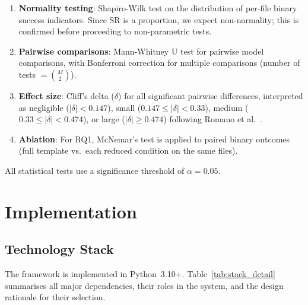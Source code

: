 \begin{enumerate}
  \item \textbf{Normality testing}: Shapiro-Wilk test on the distribution of
    per-file binary success indicators.  Since SR is a proportion, we expect
    non-normality; this is confirmed before proceeding to non-parametric tests.
  \item \textbf{Pairwise comparisons}: Mann-Whitney U test for pairwise model
    comparisons, with Bonferroni correction for multiple comparisons (number
    of tests $= \binom{M}{2}$).
  \item \textbf{Effect size}: Cliff's delta ($\delta$) for all significant
    pairwise differences, interpreted as negligible ($|\delta| < 0.147$),
    small ($0.147 \leq |\delta| < 0.33$), medium ($0.33 \leq |\delta| < 0.474$),
    or large ($|\delta| \geq 0.474$) following Romano et al.\ \cite{romano2006}.
  \item \textbf{Ablation}: For RQ1, McNemar's test is applied to paired binary
    outcomes (full template vs.\ each reduced condition on the same files).
\end{enumerate}

\noindent
All statistical tests use a significance threshold of $\alpha = 0.05$.

\section{Implementation}
\label{sec:implementation}

\subsection{Technology Stack}

The framework is implemented in Python~3.10+.  Table~\ref{tab:stack_detail}
summarises all major dependencies, their roles in the system, and the design
rationale for their selection.

